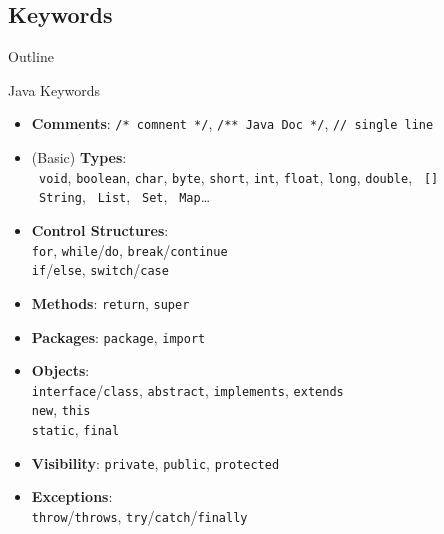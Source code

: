 \documentclass[English,c,%
hyperref={%
    pdftitle={FISA-DE2 OOP in Java},%
    pdfauthor={Muller, Gravier, Laforest, Subercaze},%
    pdfsubject={OOP in Java},%
    pdfkeywords={OOP, Java},%
    colorlinks=true,%
    urlcolor=blue,%
    linkcolor=%
    },%
xcolor={pdftex,svgnames} %
]{beamer}
\begin{document}

\subsection{Keywords}
   \begin{frame}{Outline}
       \tableofcontents[currentsubsection]
   \end{frame}

\begin{frame}{Java Keywords}

  { \footnotesize
  \begin{itemize}

    \item \textbf{Comments}: \texttt{/* comnent */}, \texttt{/** Java Doc */}, \texttt{// single line} \\

    \item (Basic) \textbf{Types}: \\
    \texttt{\color{red} void}, \texttt{boolean}, \texttt{char}, \texttt{byte},
    \texttt{short}, \texttt{int}, \texttt{float}, \texttt{long},
    \texttt{double}, \texttt{\color{red} []}\\
    \texttt{\color{red} String}, \texttt{\color{red} List}, \texttt{\color{red} Set}, \texttt{\color{red} Map}\ldots{}

    \item \textbf{Control Structures}: \\
    \texttt{for}, \texttt{while}/\texttt{do},
    \texttt{break}/\texttt{continue}\\
    \texttt{if}/\texttt{else}, \texttt{switch}/\texttt{case}

    \item \textbf{Methods}: \texttt{return}, \texttt{super}

    \item \textbf{Packages}: \texttt{package}, \texttt{import}

    \item \textbf{Objects}:\\
    \texttt{interface}/\texttt{class}, \texttt{abstract},
    \texttt{implements}, \texttt{extends}\\
    \texttt{new}, \texttt{this}\\
    \texttt{static}, \texttt{final}

    \item \textbf{Visibility}: \texttt{private}, \texttt{public}, \texttt{protected}

    \item \textbf{Exceptions}:\\
    \texttt{throw}/\texttt{throws}, \texttt{try}/\texttt{catch}/\texttt{finally}

  \end{itemize}
}

\end{frame}
\end{document}
